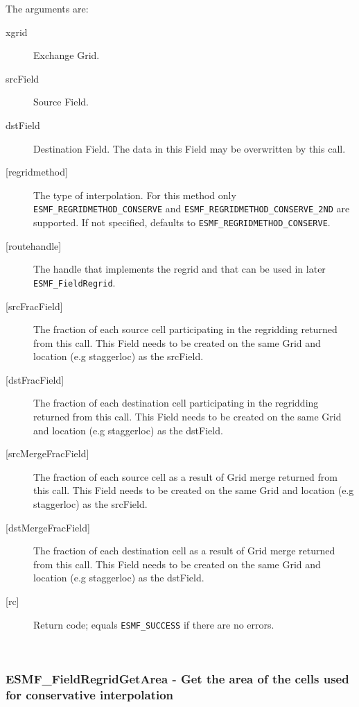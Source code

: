        The arguments are:
       \begin{description}
       \item [xgrid]
             Exchange Grid.
       \item [srcField]
             Source Field.
       \item [dstField]
             Destination Field. The data in this Field may be overwritten by this call. 
       \item [{[regridmethod]}]
             The type of interpolation. For this method only 
             {\tt ESMF\_REGRIDMETHOD\_CONSERVE} and {\tt ESMF\_REGRIDMETHOD\_CONSERVE\_2ND} are
             supported. If not specified, defaults to {\tt ESMF\_REGRIDMETHOD\_CONSERVE}.
       \item [{[routehandle]}]
             The handle that implements the regrid and that can be used in later 
             {\tt ESMF\_FieldRegrid}.
       \item [{[srcFracField]}] 
             The fraction of each source cell participating in the regridding returned from this call. 
             This Field needs to be created on the same Grid and location (e.g staggerloc) 
             as the srcField.
       \item [{[dstFracField]}] 
             The fraction of each destination cell participating in the regridding returned from this call. 
             This Field needs to be created on the same Grid and location (e.g staggerloc) 
             as the dstField.
       \item [{[srcMergeFracField]}] 
             The fraction of each source cell as a result of Grid merge returned from this call.
             This Field needs to be created on the same Grid and location (e.g staggerloc) 
             as the srcField.
       \item [{[dstMergeFracField]}] 
             The fraction of each destination cell as a result of Grid merge returned from this call.
             This Field needs to be created on the same Grid and location (e.g staggerloc) 
             as the dstField.
       \item [{[rc]}]
             Return code; equals {\tt ESMF\_SUCCESS} if there are no errors.
       \end{description}
   
 
\mbox{}\hrulefill\ 
 
\subsubsection [ESMF\_FieldRegridGetArea] {ESMF\_FieldRegridGetArea - Get the area of the cells used for conservative interpolation}


